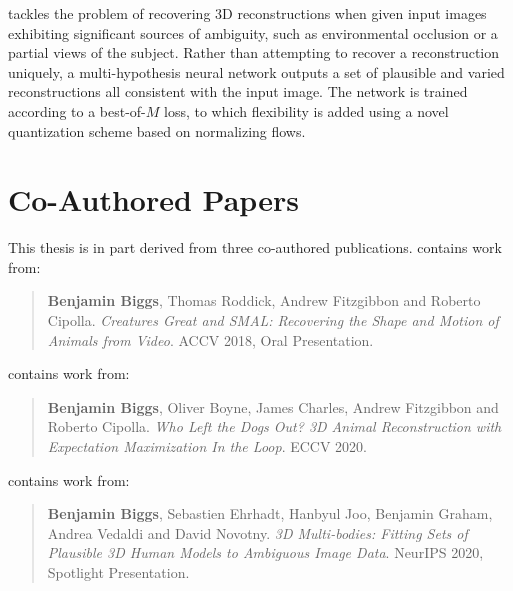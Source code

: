  tackles the problem of recovering 3D reconstructions when given input images exhibiting significant sources of ambiguity, such as environmental occlusion or a partial views of the subject. Rather than attempting to recover a reconstruction uniquely, a multi-hypothesis neural network outputs a set of plausible and varied reconstructions all consistent with the input image. The network is trained according to a best-of-$M$ loss, to which flexibility is added using a novel quantization scheme based on normalizing flows. 

\section{Co-Authored Papers}  %

This thesis is in part derived from three co-authored publications.  contains work from:

\begin{quote}
    \textbf{Benjamin Biggs}, Thomas Roddick, Andrew Fitzgibbon and Roberto Cipolla. \emph{Creatures Great and SMAL: Recovering the Shape and Motion of Animals from Video}. ACCV 2018, Oral Presentation.
\end{quote}

\noindent
{} contains work from:

\begin{quote}
    \textbf{Benjamin Biggs}, Oliver Boyne, James Charles, Andrew Fitzgibbon and Roberto Cipolla. \emph{Who Left the Dogs Out? 3D Animal Reconstruction with Expectation Maximization In the Loop}. ECCV 2020.
\end{quote}

\noindent
{} contains work from:

\begin{quote}
    \textbf{Benjamin Biggs}, Sebastien Ehrhadt, Hanbyul Joo, Benjamin Graham, Andrea Vedaldi and David Novotny. \emph{3D Multi-bodies: Fitting Sets of Plausible 3D Human Models to Ambiguous Image Data}. NeurIPS 2020, Spotlight Presentation.
\end{quote}